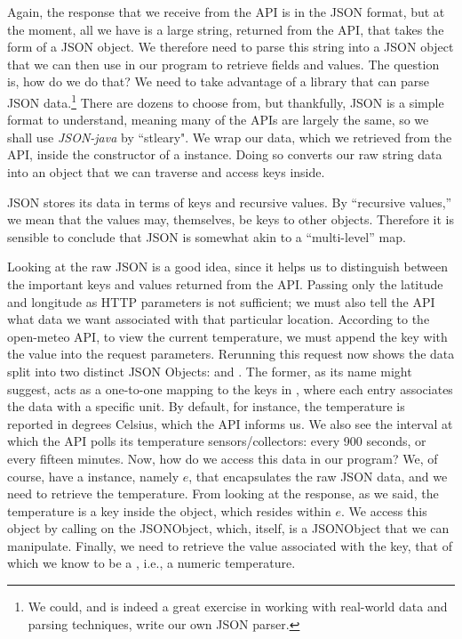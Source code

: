Again, the response that we receive from the API is in the JSON format, but at the moment, all we have is a large string, returned from the API, that takes the form of a JSON object. We therefore need to parse this string into a JSON object that we can then use in our program to retrieve fields and values. The question is, how do we do that? We need to take advantage of a library that can parse JSON data.\footnote{We could, and is indeed a great exercise in working with real-world data and parsing techniques, write our own JSON parser.} There are dozens to choose from, but thankfully, JSON is a simple format to understand, meaning many of the APIs are largely the same, so we shall use \textit{JSON-java} by ``stleary". We wrap our data, which we retrieved from the API, inside the constructor of a  instance. Doing so converts our raw string data into an object that we can traverse and access keys inside. 

JSON stores its data in terms of keys and recursive values. By ``recursive values,'' we mean that the values may, themselves, be keys to other objects. Therefore it is sensible to conclude that JSON is somewhat akin to a ``multi-level'' map. 

Looking at the raw JSON is a good idea, since it helps us to distinguish between the important keys and values returned from the API. Passing only the latitude and longitude as HTTP parameters is not sufficient; we must also tell the API what data we want associated with that particular location. According to the open-meteo API, to view the current temperature, we must append the  key with the  value into the request parameters. Rerunning this request now shows the data split into two distinct JSON Objects:  and . The former, as its name might suggest, acts as a one-to-one mapping to the keys in , where each entry associates the data with a specific unit. By default, for instance, the temperature is reported in degrees Celsius, which the API informs us. We also see the interval at which the API polls its temperature sensors/collectors: every 900 seconds, or every fifteen minutes. Now, how do we access this data in our program? We, of course, have a  instance, namely $e$, that encapsulates the raw JSON data, and we need to retrieve the temperature. From looking at the response, as we said, the temperature is a key inside the  object, which resides within $e$. We access this object by calling  on the JSONObject, which, itself, is a JSONObject that we can manipulate. Finally, we need to retrieve the value associated with the  key, that of which we know to be a , i.e., a numeric temperature.

